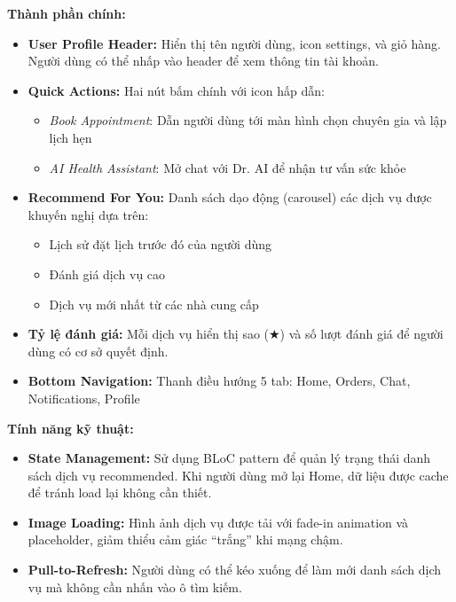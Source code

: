 \textbf{Thành phần chính:}

\begin{itemize}
    \item \textbf{User Profile Header:} Hiển thị tên người dùng, icon settings, và giỏ hàng. Người dùng có thể nhấp vào header để xem thông tin tài khoản.
    
    \item \textbf{Quick Actions:} Hai nút bấm chính với icon hấp dẫn:
    \begin{itemize}
        \item \textit{Book Appointment}: Dẫn người dùng tới màn hình chọn chuyên gia và lập lịch hẹn
        \item \textit{AI Health Assistant}: Mở chat với Dr. AI để nhận tư vấn sức khỏe
    \end{itemize}
    
    \item \textbf{Recommend For You:} Danh sách dạo động (carousel) các dịch vụ được khuyến nghị dựa trên:
    \begin{itemize}
        \item Lịch sử đặt lịch trước đó của người dùng
        \item Đánh giá dịch vụ cao
        \item Dịch vụ mới nhất từ các nhà cung cấp
    \end{itemize}
    
    \item \textbf{Tỷ lệ đánh giá:} Mỗi dịch vụ hiển thị sao (★) và số lượt đánh giá để người dùng có cơ sở quyết định.
    
    \item \textbf{Bottom Navigation:} Thanh điều hướng 5 tab: Home, Orders, Chat, Notifications, Profile
\end{itemize}

\textbf{Tính năng kỹ thuật:}

\begin{itemize}
    \item \textbf{State Management:} Sử dụng BLoC pattern để quản lý trạng thái danh sách dịch vụ recommended. Khi người dùng mở lại Home, dữ liệu được cache để tránh load lại không cần thiết.
    
    \item \textbf{Image Loading:} Hình ảnh dịch vụ được tải với fade-in animation và placeholder, giảm thiểu cảm giác ``trắng'' khi mạng chậm.
    
    \item \textbf{Pull-to-Refresh:} Người dùng có thể kéo xuống để làm mới danh sách dịch vụ mà không cần nhấn vào ô tìm kiếm.
\end{itemize}

